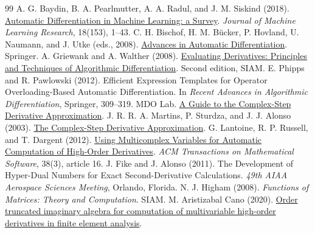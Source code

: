 \documentclass[10pt]{article}
\begin{document}
\clearpage
\begingroup
\small
\begin{thebibliography}{99}
A. G. Baydin, B. A. Pearlmutter, A. A. Radul, and J. M. Siskind (2018).
\href{https://jmlr.org/papers/v18/17-468.html}{Automatic Differentiation in Machine Learning: a Survey}.
\emph{Journal of Machine Learning Research}, 18(153), 1--43.
C. H. Bischof, H. M. B\"ucker, P. Hovland, U. Naumann, and J. Utke (eds., 2008).
\href{https://link.springer.com/book/10.1007/978-3-540-68942-3}{Advances in Automatic Differentiation}.
Springer.
A. Griewank and A. Walther (2008).
\href{https://epubs.siam.org/doi/book/10.1137/1.9780898717761}{Evaluating Derivatives: Principles and Techniques of Algorithmic Differentiation}.
Second edition, SIAM.
E. Phipps and R. Pawlowski (2012).
Efficient Expression Templates for Operator Overloading-Based Automatic Differentiation.
In \emph{Recent Advances in Algorithmic Differentiation}, Springer, 309--319.
MDO Lab. \href{https://mdolab.engin.umich.edu/wiki/guide-complex-step-derivative-approximation}{A Guide to the Complex-Step Derivative Approximation}.
J. R. R. A. Martins, P. Sturdza, and J. J. Alonso (2003).
\href{https://mdolab.engin.umich.edu/bibliography/Martins2003a}{The Complex-Step Derivative Approximation}.
G. Lantoine, R. P. Russell, and T. Dargent (2012).
\href{https://doi.org/10.1145/2168773.2168774}{Using Multicomplex Variables for Automatic Computation of High-Order Derivatives}.
\emph{ACM Transactions on Mathematical Software}, 38(3), article 16.
J. Fike and J. Alonso (2011).
The Development of Hyper-Dual Numbers for Exact Second-Derivative Calculations.
\emph{49th AIAA Aerospace Sciences Meeting}, Orlando, Florida.
N. J. Higham (2008).
\emph{Functions of Matrices: Theory and Computation}. SIAM.
M. Aristizabal Cano (2020).
\href{https://repository.eafit.edu.co/bitstreams/cc604c41-15b6-4a47-a076-0aec419e6391/download}{Order truncated imaginary algebra for computation of multivariable high-order derivatives in finite element analysis}.
\end{thebibliography}
\endgroup
\end{document}
